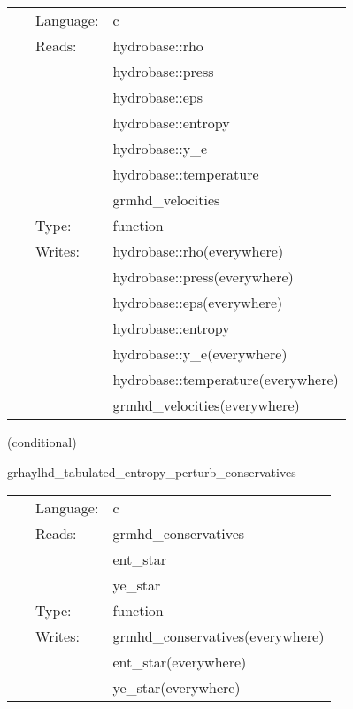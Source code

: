 \documentclass{article}
\begin{document}
 \begin{tabular*}{160mm}{cll} 
~ & Language:  & c \\ 
~ & Reads:  & hydrobase::rho \\ 
~& ~ &hydrobase::press\\ 
~& ~ &hydrobase::eps\\ 
~& ~ &hydrobase::entropy\\ 
~& ~ &hydrobase::y\_e\\ 
~& ~ &hydrobase::temperature\\ 
~& ~ &grmhd\_velocities\\ 
~ & Type:  & function \\ 
~ & Writes:  & hydrobase::rho(everywhere) \\ 
~& ~ &hydrobase::press(everywhere)\\ 
~& ~ &hydrobase::eps(everywhere)\\ 
~& ~ &hydrobase::entropy\\ 
~& ~ &hydrobase::y\_e(everywhere)\\ 
~& ~ &hydrobase::temperature(everywhere)\\ 
~& ~ &grmhd\_velocities(everywhere)\\ 
\end{tabular*} 


\vspace{5mm}

   (conditional) 

\hspace{5mm} grhaylhd\_tabulated\_entropy\_perturb\_conservatives 

\hspace{5mm}{\it entropy+tabulated version of grhaylhd\_perturb\_conservatives } 


\hspace{5mm}

 \begin{tabular*}{160mm}{cll} 
~ & Language:  & c \\ 
~ & Reads:  & grmhd\_conservatives \\ 
~& ~ &ent\_star\\ 
~& ~ &ye\_star\\ 
~ & Type:  & function \\ 
~ & Writes:  & grmhd\_conservatives(everywhere) \\ 
~& ~ &ent\_star(everywhere)\\ 
~& ~ &ye\_star(everywhere)\\ 
\end{tabular*} 
\end{document}
